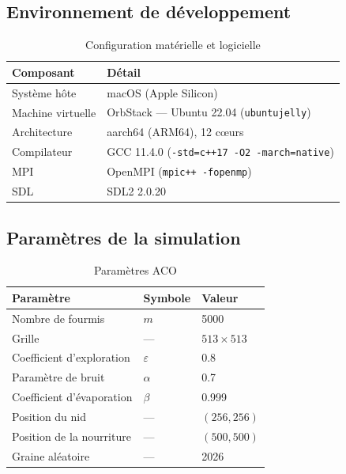 \documentclass[11pt,a4paper]{article}
\begin{document}
\subsection{Environnement de développement}

\begin{table}[H]
\centering
\begin{tabular}{ll}
\toprule
\textbf{Composant} & \textbf{Détail} \\
\midrule
Système hôte      & macOS (Apple Silicon) \\
Machine virtuelle  & OrbStack --- Ubuntu 22.04 (\texttt{ubuntujelly}) \\
Architecture       & aarch64 (ARM64), 12 c\oe urs \\
Compilateur        & GCC 11.4.0 (\texttt{-std=c++17 -O2 -march=native}) \\
MPI                & OpenMPI (\texttt{mpic++ -fopenmp}) \\
SDL                & SDL2 2.0.20 \\
\bottomrule
\end{tabular}
\caption{Configuration matérielle et logicielle}
\label{tab:env}
\end{table}

\subsection{Paramètres de la simulation}

\begin{table}[H]
\centering
\begin{tabular}{lll}
\toprule
\textbf{Paramètre} & \textbf{Symbole} & \textbf{Valeur} \\
\midrule
Nombre de fourmis            & $m$          & 5000 \\
Grille                       & ---          & $513 \times 513$ \\
Coefficient d'exploration    & $\varepsilon$ & 0.8 \\
Paramètre de bruit           & $\alpha$     & 0.7 \\
Coefficient d'évaporation    & $\beta$      & 0.999 \\
Position du nid              & ---          & $(256, 256)$ \\
Position de la nourriture    & ---          & $(500, 500)$ \\
Graine aléatoire             & ---          & 2026 \\
\bottomrule
\end{tabular}
\caption{Paramètres ACO}
\label{tab:params}
\end{table}
\end{document}

